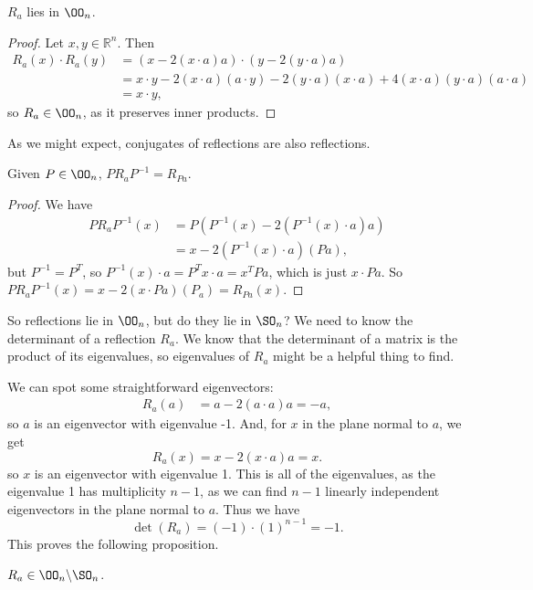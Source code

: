 \documentclass[a4paper]{scrartcl}
\begin{document}
\begin{lemma}
	$R_a$ lies in $\OO_n$.
\end{lemma}
\begin{proof}
	Let $x, y \in \mathbb{R}^n$. Then
	\begin{align*}
		R_a(x) \cdot R_a(y) &= (x - 2(x \cdot a)a) \cdot (y - 2(y \cdot a)a) \\
		&= x \cdot y - 2(x \cdot a)(a \cdot y) - 2(y \cdot a)(x \cdot a) + 4(x \cdot a)(y \cdot a)(a \cdot a)\\
		&= x \cdot y,
	\end{align*}
	so $R_a \in \OO_n$, as it preserves inner products.
\end{proof}

As we might expect, conjugates of reflections are also reflections.

\begin{lemma}
	Given $P \in \OO_n$, $P R_a P^{-1} = R_{Pa}$.
\end{lemma}
\begin{proof}
	We have
	\begin{align*}
		P R_a P^{-1}(x) &= P(P^{-1}(x) - 2(P^{-1}(x) \cdot a)a) \\
		&= x - 2(P^{-1}(x) \cdot a)(P a),
	\end{align*}
	but $P^{-1} = P^T$, so $P^{-1}(x)\cdot a = P^T x \cdot a = x^T P a$, which is just $x \cdot Pa$. So $P R_a P^{-1}(x) = x - 2(x\cdot Pa)(P_a) = R_{Pa}(x)$.
\end{proof}


So reflections lie in $\OO_n$, but do they lie in $\SO_n$? We need to know the determinant of a reflection $R_a$. We know that the determinant of a matrix is the product of its eigenvalues, so eigenvalues of $R_a$ might be a helpful thing to find. 

We can spot some straightforward eigenvectors:
\begin{align*}
R_a(a) &= a - 2(a \cdot a)a = -a,
\end{align*}
so $a$ is an eigenvector with eigenvalue -1. And, for $x$ in the plane normal to $a$, we get
$$
R_a(x) = x - 2(x \cdot a) a = x.
$$
so $x$ is an eigenvector with eigenvalue 1. This is all of the eigenvalues, as the eigenvalue 1 has multiplicity $n - 1$, as we can find $n - 1$ linearly independent eigenvectors in the plane normal to $a$. Thus we have
$$
\det(R_a) = (-1) \cdot (1)^{n - 1} = -1.
$$
This proves the following proposition.
\begin{proposition}
	$R_a \in \OO_n \backslash \SO_n$.
\end{proposition}
\end{document}
